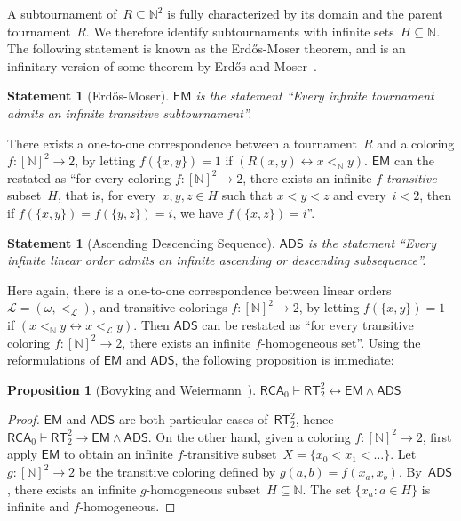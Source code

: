 \documentclass{article}
\numberwithin{theorem}{section}
\newtheorem{proposition}[theorem]{Proposition}
\newtheorem{statement}[theorem]{Statement}
\newcommand{\RCA}{\mathsf{RCA}}
\newcommand{\EM}{\mathsf{EM}}
\newcommand{\ADS}{\mathsf{ADS}}
\newcommand{\RT}{\mathsf{RT}}
\renewcommand{\L}{\mathcal{L}}
\newcommand{\NN}{\mathbb{N}}
\def\qt#1{``#1''}%
\begin{document}
A subtournament of~$R \subseteq \NN^2$ is fully characterized by its domain and the parent tournament~$R$. We therefore identify subtournaments with infinite sets~$H \subseteq \NN$.
The following statement is known as the Erd\H{o}s-Moser theorem, and is an infinitary version of some theorem by Erd\H{o}s and Moser~\cite{erdos1964representation}.

\begin{statement}[Erd\H{o}s-Moser]
$\EM$ is the statement \qt{Every infinite tournament admits an infinite transitive subtournament}.
\end{statement}

There exists a one-to-one correspondence between a tournament~$R$ and a coloring $f : [\NN]^2 \to 2$, by letting $f(\{x, y\}) = 1$ if $(R(x, y) \leftrightarrow x <_\NN y)$. $\EM$ can the restated as \qt{for every coloring $f : [\NN]^2 \to 2$, there exists an infinite \emph{$f$-transitive} subset~$H$, that is, for every~$x, y, z \in H$ such that $x < y < z$ and every~$i < 2$, then if $f(\{x, y\}) = f(\{y, z\}) = i$, we have $f(\{x, z\}) = i$}.

\begin{statement}[Ascending Descending Sequence]
$\ADS$ is the statement \qt{Every infinite linear order admits an infinite ascending or descending subsequence}.
\end{statement}

Here again, there is a one-to-one correspondence between linear orders $\L = (\omega, <_\L)$, and transitive colorings $f : [\NN]^2 \to 2$, by letting $f(\{x, y\}) = 1$ if $(x <_\NN y \leftrightarrow x <_\L y)$. Then $\ADS$ can be restated as \qt{for every transitive coloring $f : [\NN]^2 \to 2$, there exists an infinite $f$-homogeneous set}.
Using the reformulations of $\EM$ and $\ADS$, the following proposition is immediate:

\begin{proposition}[Bovyking and Weiermann~\cite{bovykin2017strength}]
$\RCA_0 \vdash \RT^2_2 \leftrightarrow \EM \wedge \ADS$
\end{proposition}
\begin{proof}
$\EM$ and $\ADS$ are both particular cases of~$\RT^2_2$, hence $\RCA_0 \vdash \RT^2_2 \rightarrow \EM \wedge \ADS$. On the other hand, given a coloring $f : [\NN]^2 \to 2$, first apply $\EM$ to obtain an infinite $f$-transitive subset~$X = \{x_0 < x_1 < \dots \}$. Let~$g : [\NN]^2 \to 2$ be the transitive coloring defined by $g(a, b) = f(x_a, x_b)$. By~$\ADS$, there exists an infinite $g$-homogeneous subset~$H \subseteq \NN$. The set $\{ x_a : a \in H \}$ is infinite and $f$-homogeneous.
\end{proof}
\end{document}
